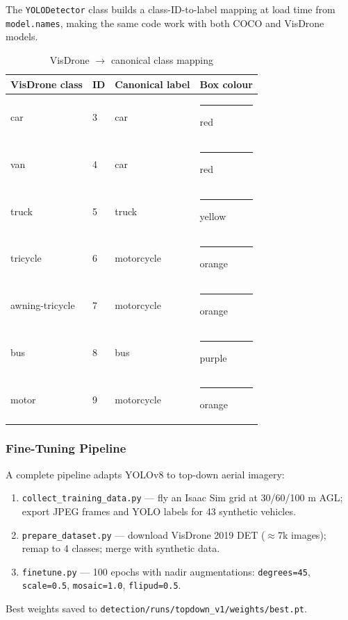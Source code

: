 \documentclass[11pt,a4paper]{article}
\begin{document}
The \texttt{YOLODetector} class builds a class-ID-to-label mapping at load time from
\texttt{model.names}, making the same code work with both COCO and VisDrone models.

\begin{table}[h]
\centering
\caption{VisDrone \ensuremath{\to} canonical class mapping}
\begin{tabular}{@{}llll@{}}
\toprule
\textbf{VisDrone class} & \textbf{ID} & \textbf{Canonical label} & \textbf{Box colour}\\
\midrule
car & 3 & car & \textcolor{red!80!black}{\rule{0.8cm}{4pt}} red\\
van & 4 & car & \textcolor{red!80!black}{\rule{0.8cm}{4pt}} red\\
truck & 5 & truck & \textcolor{yellow!80!black}{\rule{0.8cm}{4pt}} yellow\\
tricycle & 6 & motorcycle & \textcolor{orange}{\rule{0.8cm}{4pt}} orange\\
awning-tricycle & 7 & motorcycle & \textcolor{orange}{\rule{0.8cm}{4pt}} orange\\
bus & 8 & bus & \textcolor{violet}{\rule{0.8cm}{4pt}} purple\\
motor & 9 & motorcycle & \textcolor{orange}{\rule{0.8cm}{4pt}} orange\\
\bottomrule
\end{tabular}
\end{table}

\subsubsection*{Fine-Tuning Pipeline}

A complete pipeline adapts YOLOv8 to top-down aerial imagery:

\begin{enumerate}
  \item \texttt{collect\_training\_data.py} --- fly an Isaac Sim grid at 30/60/100 m AGL; export JPEG frames and YOLO labels for 43 synthetic vehicles.
  \item \texttt{prepare\_dataset.py} --- download VisDrone 2019 DET ($\approx$7k images); remap to 4 classes; merge with synthetic data.
  \item \texttt{finetune.py} --- 100 epochs with nadir augmentations: \texttt{degrees=45}, \texttt{scale=0.5}, \texttt{mosaic=1.0}, \texttt{flipud=0.5}.
\end{enumerate}

Best weights saved to \texttt{detection/runs/topdown\_v1/weights/best.pt}.
\end{document}
